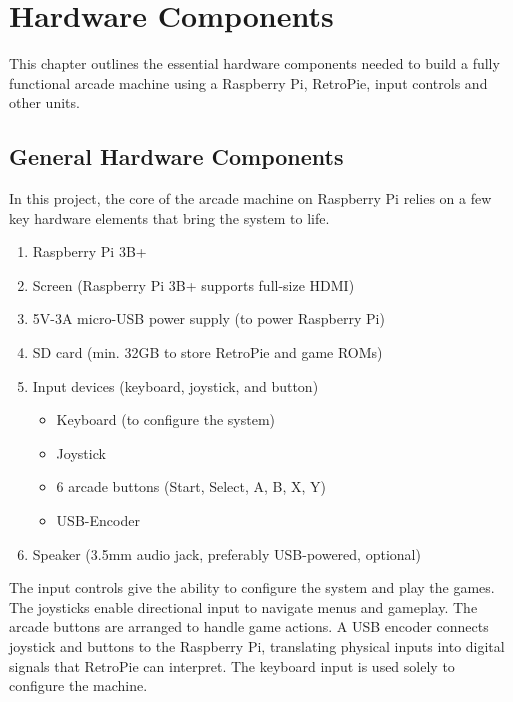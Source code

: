 \chapter{Hardware Components}
\label{cha:hardware_components}

This chapter outlines the essential hardware components needed to build a fully functional arcade machine using a Raspberry Pi, RetroPie, input controls and other units.

\section{General Hardware Components}
\label{sec:general_hardware_components}

In this project, the core of the arcade machine on Raspberry Pi relies on a few key hardware elements that bring the system to life.

\begin{enumerate}
  \item Raspberry Pi 3B+
  \item Screen (Raspberry Pi 3B+ supports full-size HDMI)
  \item 5V-3A micro-USB power supply (to power Raspberry Pi)
  \item SD card (min. 32GB to store RetroPie and game ROMs)
  \item Input devices (keyboard, joystick, and button)
    \begin{itemize}
      \item Keyboard (to configure the system)
      \item Joystick
      \item 6 arcade buttons (Start, Select, A, B, X, Y)
      \item USB-Encoder
    \end{itemize}
  \item Speaker (3.5mm audio jack, preferably USB-powered, optional)
\end{enumerate}

The input controls give the ability to configure the system and play the games. The joysticks enable directional input to navigate menus and gameplay. The arcade buttons are arranged to handle game actions. A USB encoder connects joystick and buttons to the Raspberry Pi, translating physical inputs into digital signals that RetroPie can interpret. The keyboard input is used solely to configure the machine.
